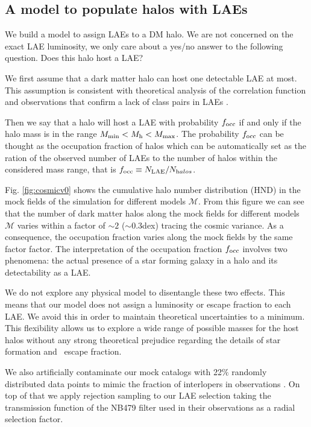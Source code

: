 \documentclass{emulateapj}
\newcommand{\ly}{{\ifmmode{{\rm Ly}\alpha}\else{Ly$\alpha$}\fi}}
\begin{document}
\subsection{A model to populate halos with LAEs}
\label{subsec:mocks}

We build a model to assign LAEs to a DM halo. 
We are not concerned on the exact LAE luminosity, we only care about a yes/no answer to the following question. Does this halo host a LAE?

We first assume that a dark matter halo can host one detectable LAE at most.  
This assumption is consistent with theoretical analysis of the correlation function \citep{Jose2013b} and observations that confirm a lack of class pairs in LAEs \cite{Bond2009}. 

Then we say that a halo will host a LAE with probability $f_{\rm occ}$ if and only if the halo mass is in the range $M_{\rm min}< M_{\mathrm h} < M_{\rm max}$.
The probability $f_{\rm occ}$ can be thought as the occupation fraction of halos which can be automatically set as the ration of the observed number of LAEs to the number of halos within the considered mass range, that is $f_{\rm occ}\equiv N_{\rm LAE}/N_{\mathrm halos}$.

Fig. \ref{fig:cosmicv0}  shows the cumulative halo number distribution (HND) in the  mock fields of the simulation for different models $\mathcal{M}$. From this figure we can see that the number of dark matter halos along the mock fields for different models $\mathcal{M}$ varies within a factor of $\sim 2$ ($\sim 0.3$dex) tracing the cosmic variance. As a consequence, the occupation fraction varies along  the mock fields  by the same factor factor. The interpretation of the occupation fraction $f_{\rm occ}$ involves two phenomena: the actual presence of a star forming galaxy in a halo and its detectability as a LAE. 

We do not explore any physical model to disentangle these two effects. This means that our model does not assign a luminosity or escape fraction to each
LAE.
We avoid this in order to maintain theoretical uncertainties to a minimum. 
This flexibility allows us to explore a wide range of possible masses for
the host halos without any strong theoretical prejudice regarding the
details of star formation and \ly\  escape fraction.

We also artificially contaminate our mock catalogs with 22$\%$ randomly distributed data points to mimic the fraction of interlopers in observations \citet{Bielby16} .
On top of that we apply rejection sampling  to our LAE selection taking the transmission function of the NB479 filter used in their observations as a radial selection factor.
\end{document}
